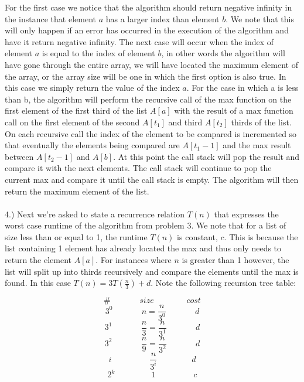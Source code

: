 \documentclass[paper=a4, 11pt]{scrartcl}
\begin{document}
For the first case we notice that the algorithm should return negative infinity in the instance that element $a$ has a larger index than element $b$. We note that this will only happen if an error has occurred in the execution of the algorithm and have it return negative infinity. The next case will occur when the index of element $a$ is equal to the index of element $b$, in other words the algorithm will have gone through the entire array, we will have located the maximum element of the array, or the array size will be one in which the first option is also true. In this case we simply return the value of the index $a$. For the case in which a is less than b, the algorithm will perform the recursive call of the max function on the first element of the first third of the list $A[a]$ with the result of a max function call on the first element of the second $A[t_1]$ and third $A[t_2]$ thirds of the list. On each recursive call the index of the element to be compared is incremented so that eventually the elements being compared are $A[t_1-1]$ and the max result between $A[t_2-1]$ and $A[b]$. At this point the call stack will pop the result and compare it with the next elements. The call stack will continue to pop the current max and compare it until the call stack is empty. The algorithm will then return the maximum element of the list.\\ \\
4.) Next we're asked to state a recurrence relation $T(n)$ that expresses the worst case runtime of the algorithm from problem 3. We note that for a list of size less than or equal to 1, the runtime $T(n)$ is constant, $c$. This is because the list containing 1 element has already located the max and thus only needs to return the element $A[a]$. For instances where $n$ is greater than 1 however, the list will split up into thirds recursively and compare the elements until the max is found. In this case $T(n)=3T(\frac{n}{3})+d$. Note the following recursion tree table:

$$\#\ \ \ \ \ \ \ \ \ \ \ \ \ \ \ \ size\ \ \ \ \ \ \ \ \ \ \ \ \ \ \ \ \ \ cost$$ 
$$3^0\ \ \ \ \ \ \ \ \ \ \ \ \ \ \ \ n=\frac{n}{3^0}\ \ \ \ \ \ \ \ \ \ \ \ \ \ \ \ d$$
$$3^1\ \ \ \ \ \ \ \ \ \ \ \ \ \ \ \ \frac{n}{3}=\frac{n}{3^1}\ \ \ \ \ \ \ \ \ \ \ \ \ \ \ \ d$$
$$3^2\ \ \ \ \ \ \ \ \ \ \ \ \ \ \ \ \frac{n}{9}=\frac{n}{3^2}\ \ \ \ \ \ \ \ \ \ \ \ \ \ \ \ d$$
$$i\ \ \ \ \ \ \ \ \ \ \ \ \ \ \ \ \ \ \ \ \ \frac{n}{3^i}\ \ \ \ \ \ \ \ \ \ \ \ \ \ \ \ \ \ \ d$$
$$ 2^{k}\ \ \ \ \ \ \ \ \ \ \ \ \ \ \ \ \ \ \ \ 1\ \ \ \ \ \ \ \ \ \ \ \ \ \ \ \ \ \ \ \ \ c$$
\end{document}
